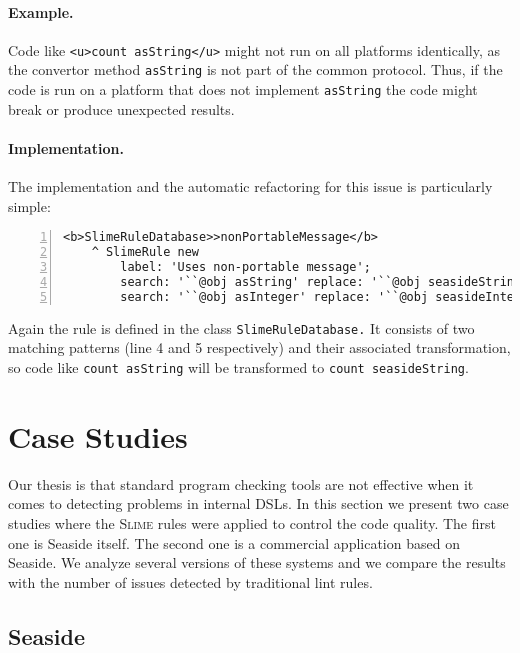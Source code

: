 \documentclass[10pt,twocolumn]{article}
\newcommand{\ct}{\lstinline[backgroundcolor=\color{white}]}
\newcommand{\Slime}{\textsc{Slime}\xspace}
\newcommand{\Seaside}{Seaside\xspace}
\begin{document}
\paragraph{Example.} Code like \ct{<u>count asString</u>} might not run on all platforms identically, as the convertor method \ct{asString} is not part of the common protocol. Thus, if the code is run on a platform that does not implement \ct{asString} the code might break or produce unexpected results.

\paragraph{Implementation.} The implementation and the automatic refactoring for this issue is particularly simple:

\begin{lstlisting}[numbers=left]
<b>SlimeRuleDatabase>>nonPortableMessage</b>
	^ SlimeRule new
		label: 'Uses non-portable message';
		search: '``@obj asString' replace: '``@obj seasideString';
		search: '``@obj asInteger' replace: '``@obj seasideInteger'
\end{lstlisting}

Again the rule is defined in the class \ct{SlimeRuleDatabase.} It consists of two matching patterns (line 4 and 5 re\-spec\-tive\-ly) and their associated transformation, so code like \ct{count asString} will be transformed to \ct{count seasideString}.

\section{Case Studies}\label{sec:case}

Our thesis is that standard program checking tools are not effective when it comes to detecting problems in internal DSLs. In this section we present two case studies where the \Slime rules were applied to control the code quality. The first one is \Seaside itself. The second one is a commercial application based on \Seaside. We analyze several versions of these systems and we compare the results with the number of issues detected by traditional lint rules.

\subsection{\Seaside}\label{sec:case-seaside}
\end{document}
